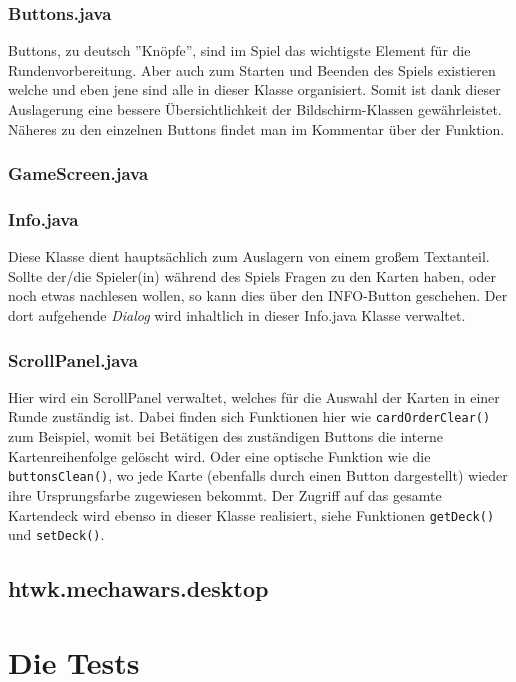 \documentclass[12pt,a4paper,oneside]{book}
\theoremstyle{plain}
\numberwithin{equation}{chapter} \DeclareMathOperator{\Var}{Var}
\begin{document}
\subsection{Buttons.java}
    Buttons, zu deutsch ''Knöpfe'', sind im Spiel das wichtigste Element für die Rundenvorbereitung. Aber auch zum Starten und Beenden des Spiels existieren welche und eben jene sind alle in dieser Klasse organisiert. Somit ist dank dieser Auslagerung eine bessere Übersichtlichkeit der Bildschirm-Klassen gewährleistet. \\
    Näheres zu den einzelnen Buttons findet man im Kommentar über der Funktion.
    
\subsection{GameScreen.java}
    

\subsection{Info.java}
    Diese Klasse dient hauptsächlich zum Auslagern von einem großem Textanteil. Sollte der/die Spieler(in) während des Spiels Fragen zu den Karten haben, oder noch etwas nachlesen wollen, so kann dies über den INFO-Button geschehen. Der dort aufgehende \textit{Dialog} wird inhaltlich in dieser Info.java Klasse verwaltet.

\subsection{ScrollPanel.java}
    Hier wird ein ScrollPanel verwaltet, welches für die Auswahl der Karten in einer Runde zuständig ist. Dabei finden sich Funktionen hier wie \texttt{cardOrderClear()} zum Beispiel, womit bei Betätigen des zuständigen Buttons die interne Kartenreihenfolge gelöscht wird. Oder eine optische Funktion wie die \texttt{buttonsClean()}, wo jede Karte (ebenfalls durch einen Button dargestellt) wieder ihre Ursprungsfarbe zugewiesen bekommt. Der Zugriff auf das gesamte Kartendeck wird ebenso in dieser Klasse realisiert, siehe Funktionen \texttt{getDeck()} und \texttt{setDeck()}.

\newpage
\section{htwk.mechawars.desktop}

\chapter{Die Tests}
\end{document}
